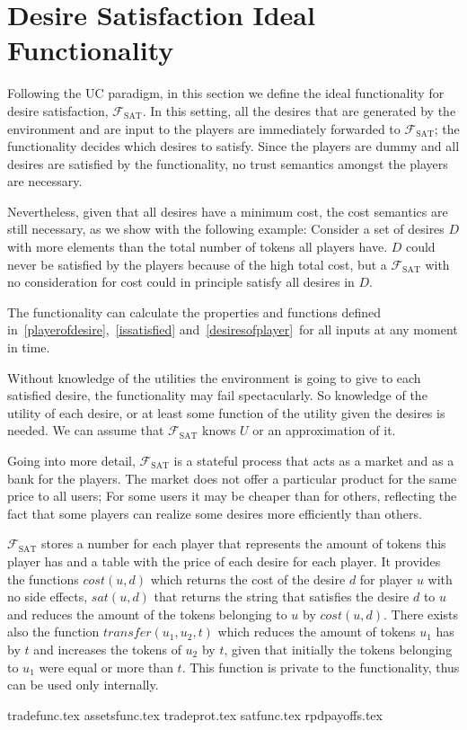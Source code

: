 \section{Desire Satisfaction Ideal Functionality}
  Following the UC paradigm, in this section we define the ideal functionality for desire
  satisfaction, $\mathcal{F}_{\mathrm{SAT}}$. In this setting, all the desires that are
  generated by the environment and are input to the players are immediately forwarded to
  $\mathcal{F}_{\mathrm{SAT}}$; the functionality decides which desires to satisfy. Since
  the players are dummy and all desires are satisfied by the functionality, no trust
  semantics amongst the players are necessary.

  Nevertheless, given that all desires have a minimum cost, the cost semantics are still
  necessary, as we show with the following example: Consider a set of desires $D$ with
  more elements than the total number of tokens all players have. $D$ could never be
  satisfied by the players because of the high total cost, but a
  $\mathcal{F}_{\mathrm{SAT}}$ with no consideration for cost could in principle satisfy
  all desires in $D$.

  The functionality can calculate the properties and functions defined
  in~\ref{playerofdesire},~\ref{issatisfied} and~\ref{desiresofplayer}\ for all inputs at
  any moment in time.

  Without knowledge of the utilities the environment is going to give to each satisfied
  desire, the functionality may fail spectacularly. So knowledge of the utility of each
  desire, or at least some function of the utility given the desires is needed. We can
  assume that $\mathcal{F}_{\mathrm{SAT}}$ knows $U$ or an approximation of it.

  Going into more detail, $\mathcal{F}_{\mathrm{SAT}}$ is a stateful process that acts as
  a market and as a bank for the players. The market does not offer a particular product
  for the same price to all users; For some users it may be cheaper than for others,
  reflecting the fact that some players can realize some desires more efficiently than
  others.

  $\mathcal{F}_{\mathrm{SAT}}$ stores a number for each player that represents the amount
  of tokens this player has and a table with the price of each desire for each player. It
  provides the functions $cost\left(u, d\right)$ which returns the cost of the desire $d$
  for player $u$ with no side effects, $sat\left(u, d\right)$ that returns the string that
  satisfies the desire $d$ to $u$ and reduces the amount of the tokens belonging to $u$ by
  $cost\left(u, d\right)$. There exists also the function $transfer\left(u_1, u_2,
  t\right)$ which reduces the amount of tokens $u_1$ has by $t$ and increases the tokens
  of $u_2$ by $t$, given that initially the tokens belonging to $u_1$ were equal or more
  than $t$. This function is private to the functionality, thus can be used only
  internally.

  {tradefunc.tex}
  {assetsfunc.tex}
  {tradeprot.tex}
  {satfunc.tex}
  {rpdpayoffs.tex}
